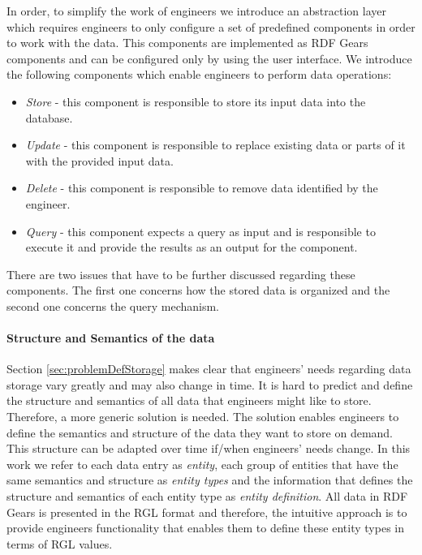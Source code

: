 In order, to simplify the work of engineers we introduce an abstraction layer which requires engineers to only configure a set of predefined components in order to work with the data. This components are implemented as RDF Gears components and can be configured only by using the user interface. We introduce the following components which enable engineers to perform data operations:

\begin{itemize}
	\item \textit{Store} - this component is responsible to store its input data into the database.
	\item \textit{Update} - this component is responsible to replace existing data or parts of it with the provided input data.
	\item \textit{Delete} - this component is responsible to remove data identified by the engineer.
	\item \textit{Query} - this component expects a query as input and is responsible to execute it and provide the results as an output for the component.
\end{itemize}

There are two issues that have to be further discussed regarding these components. The first one concerns how the stored data is organized and the second one concerns the query mechanism.

\paragraph{Structure and Semantics of the data}
Section \ref{sec:problemDefStorage} makes clear that engineers' needs regarding data storage vary greatly and may also change in time. It is hard to predict and define the structure and semantics of all data that engineers might like to store. Therefore, a more generic solution is needed. The solution enables engineers to define the semantics and structure of the data they want to store on demand. This structure can be adapted over time if/when engineers' needs change. In this work we refer to each data entry as \textit{entity}, each group of entities that have the same semantics and structure as \textit{entity types} and the information that defines the structure and semantics of each entity type as \textit{entity definition}. All data in RDF Gears is presented in the RGL format and therefore, the intuitive approach is to provide engineers functionality that enables them to define these entity types in terms of RGL values. 

